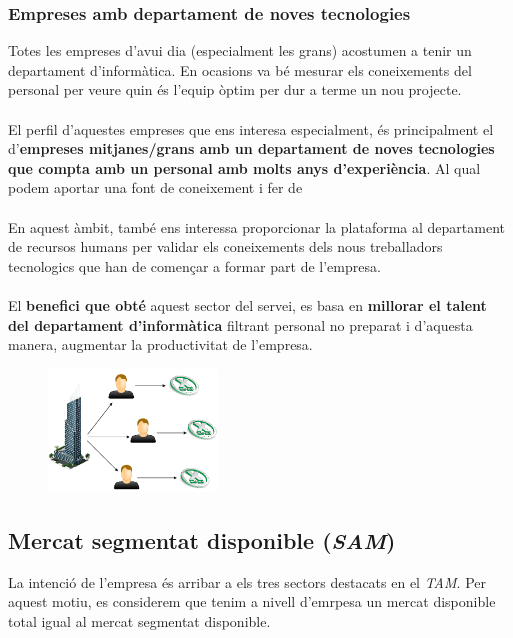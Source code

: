 \documentclass[12pt]{article}
\begin{document}
\subsubsection{Empreses amb departament de noves tecnologies}
Totes les empreses d'avui dia (especialment les grans) acostumen a tenir un departament d'informàtica. En ocasions va bé mesurar els coneixements del personal per veure quin és l'equip òptim per dur a terme un nou projecte.
\\\\El perfil d'aquestes empreses que ens interesa especialment, és principalment el d'\textbf{empreses mitjanes/grans amb un departament de noves tecnologies que compta amb un personal amb molts anys d'experiència}. Al qual podem aportar una font de coneixement i fer de 
\\\\En aquest àmbit, també ens interessa proporcionar la plataforma al departament de recursos humans per validar els coneixements dels nous treballadors tecnologics que han de començar a formar part de l'empresa.
\\\\El \textbf{benefici que obté} aquest sector del servei, es basa en \textbf{millorar el talent del departament d'informàtica} filtrant personal no preparat i d'aquesta manera, augmentar la productivitat de l'empresa.
\begin{figure}[h!]
	\centering
	\includegraphics[width=0.4\textwidth]{imatges/EmpresaFigura.png}
\end{figure}

\subsection{Mercat segmentat disponible (\textit{SAM})}
La intenció de l'empresa és arribar a els tres sectors destacats en el \textit{TAM}. Per aquest motiu, es considerem que tenim a nivell d'emrpesa un mercat disponible total igual al mercat segmentat disponible.
\end{document}
